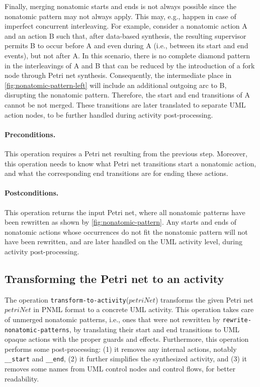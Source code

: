 \documentclass{article}
\newcommand{\keyw}[1]{\texttt{#1}}
\newcommand{\var}[1]{\ensuremath{\mathit{#1}}}
\newcommand{\transformToActivityLabel}[0]{\keyw{transform-to-activity}}
\newcommand{\rewriteNonAtomicPatternsLabel}[0]{\keyw{rewrite-nonatomic-patterns}}
\newcommand{\transformToActivity}[1]{\transformToActivityLabel(\ensuremath{#1})}
\newcommand{\startLabel}[0]{\texttt{\_\_start}}
\newcommand{\stopLabel}[0]{\texttt{\_\_end}} %
\theoremstyle{definition}
\begin{document}
Finally, merging nonatomic starts and ends is not always possible since the nonatomic pattern may not always apply.
This may, e.g., happen in case of imperfect concurrent interleaving.
For example, consider a nonatomic action \textsf{A} and an action \textsf{B} such that, after data-based synthesis, the resulting supervisor permits \textsf{B} to occur before \textsf{A} and even during \textsf{A} (i.e., between its start and end events), but not after \textsf{A}. 
In this scenario, there is no complete diamond pattern in the interleavings of \textsf{A} and \textsf{B} that can be reduced by the introduction of a fork node through Petri net synthesis. 
Consequently, the intermediate place in \autoref{fig:nonatomic-pattern-left} will include an additional outgoing arc to \textsf{B}, disrupting the nonatomic pattern. Therefore, the start and end transitions of \textsf{A} cannot be not merged.
These transitions are later translated to separate UML action nodes, to be further handled during activity post-processing.

\paragraph{Preconditions.}
This operation requires a Petri net resulting from the previous step.
Moreover, this operation needs to know what Petri net transitions start a nonatomic action, and what the corresponding end transitions are for ending these actions.

\paragraph{Postconditions.}
This operation returns the input Petri net, where all nonatomic patterns have been rewritten as shown by \autoref{fig:nonatomic-pattern}.
Any starts and ends of nonatomic actions whose occurrences do not fit the nonatomic pattern will not have been rewritten, and are later handled on the UML activity level, during activity post-processing.

\subsection{Transforming the Petri net to an activity}
\label{sec:transform-petrinet-to-activity}

The operation \transformToActivity{\var{petriNet}} transforms the given Petri net \var{petriNet} in PNML format to a concrete UML activity.
This operation takes care of unmerged nonatomic patterns, i.e., ones that were not rewritten by \rewriteNonAtomicPatternsLabel{}, by translating their start and end transitions to UML opaque actions with the proper guards and effects.
Furthermore, this operation performs some post-processing: (1) it removes any internal actions, notably \startLabel{} and \stopLabel{}, (2) it further simplifies the synthesized activity, and (3) it removes some names from UML control nodes and control flows, for better readability. 
\end{document}
